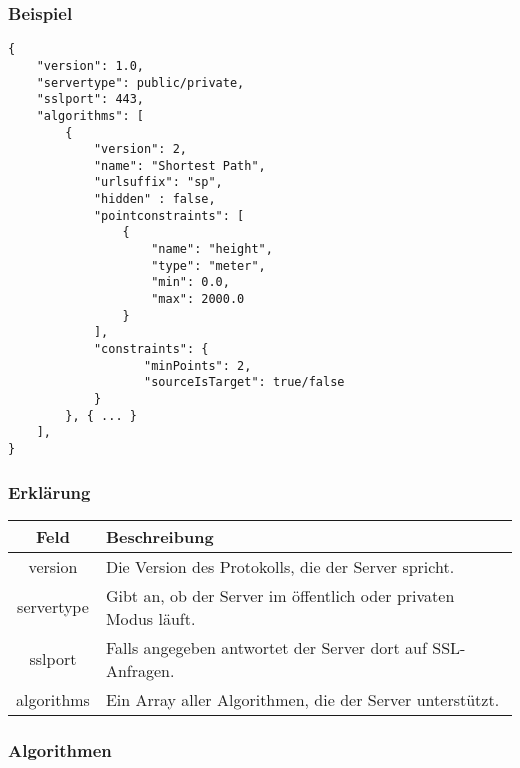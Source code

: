 \documentclass[ngerman,titlepage,parskip=true]{scrartcl}
\begin{document}
\subsubsection{Beispiel}
	
	\begin{lstlisting}
{
    "version": 1.0,
    "servertype": public/private,
    "sslport": 443,
    "algorithms": [
        {
            "version": 2,
            "name": "Shortest Path",
            "urlsuffix": "sp",
            "hidden" : false,
            "pointconstraints": [                    
                {
                    "name": "height",
                    "type": "meter",
                    "min": 0.0,
                    "max": 2000.0
                }
            ],
            "constraints": {
                   "minPoints": 2,
                   "sourceIsTarget": true/false 
            }
        }, { ... }
    ],
}
    \end{lstlisting}
    \subsubsection*{Erklärung}
    
    \begin{tabular}{|c|p{14cm}|}
    	\hline
    	\textbf{Feld} & \textbf{Beschreibung} \\ 
    	\hline \hline
    	
    	version & Die Version des Protokolls, die der Server spricht. \\ 
    	\hline
    	
    	servertype & Gibt an, ob der Server im öffentlich oder privaten Modus läuft. \\
    	\hline
    	sslport & Falls angegeben antwortet der Server dort auf SSL-Anfragen.\\
    	\hline
    	
    	algorithms & Ein Array aller Algorithmen, die der Server unterstützt. \\
    	\hline
    \end{tabular}
    
    \subsubsection*{Algorithmen}
    
\end{document}
